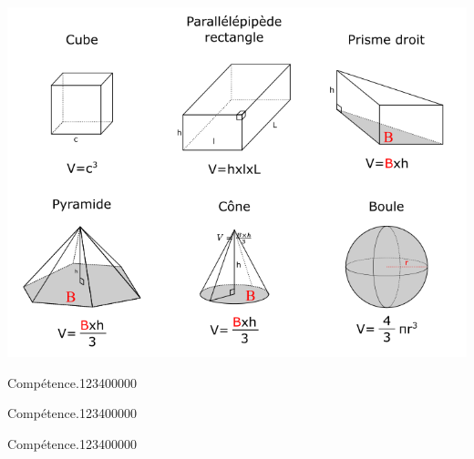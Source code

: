 \begin{pageCours}
\begin{center}
\includegraphics[width=.8\linewidth]{FIG/formulaire_volumes.png} 
\end{center}

\end{pageCours} %


\begin{pageAD}  %
\restoregeometry %


\begin{ExoCad}{Compétence.}{1234}{0}{0}{0}{0}{0}

\end{ExoCad}


\begin{ExoCad}{Compétence.}{1234}{0}{0}{0}{0}{0}

\end{ExoCad}


\begin{ExoCad}{Compétence.}{1234}{0}{0}{0}{0}{0}

\end{ExoCad}
 
\end{pageAD} %


